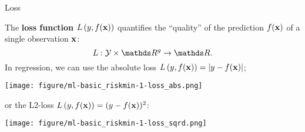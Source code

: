 \documentclass[11pt,compress,t,notes=noshow, xcolor=table]{beamer}
\begin{document}
\begin{vbframe}{Loss}

The \textbf{loss function} $L\left(y, f(\mathbf{x})\right)$ quantifies the ``quality'' of the prediction $f(\mathbf{x})$ of a single observation $\mathbf{x}$:
    $$
    L: \Yspace \times \R^g \to \R.
    $$
In regression, we can use the absolute loss $L\left(y, f(\mathbf{x})\right) = |y-f(\mathbf{x})|$; 





\begin{center}
\texttt{[image: figure/ml-basic\_riskmin-1-loss\_abs.png]}
\end{center}
or the L2-loss $L\left(y, f(\mathbf{x})\right) = (y - f(\mathbf{x}))^2$:
\begin{center}
\texttt{[image: figure/ml-basic\_riskmin-1-loss\_sqrd.png]}
\end{center}





\end{vbframe}
\end{document}
